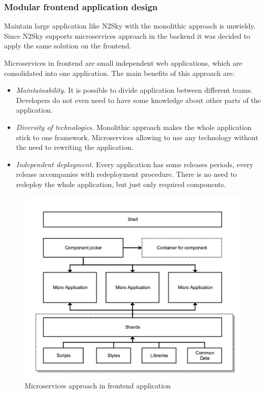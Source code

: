  
 
\subsubsection{Modular frontend application design}\label{Modular frontend application design}

Maintain large application like N2Sky with the monolithic approach is unwieldy. Since N2Sky supports microservices approach in the backend it was decided to apply the same solution on the frontend.  

Microservices in frontend are small independent web applications, which are consolidated into one application. The main benefits of this approach are:

\begin{itemize}
\item \emph{Maintainability.} It is possible to divide application between different teams. Developers do not even need to have some knowledge about other parts of the application. 
\item \emph{Diversity of technologies.} Monolithic approach makes the whole application stick to one framework. Microservices allowing to use any technology without the need to rewriting the application.
\item \emph{Independent deployment.} Every application has some releases periods, every release accompanies with redeployment procedure. There is no need to redeploy the whole application, but just only required components.
\end{itemize}


\begin{figure}[htbp]
\begin{center}
  \includegraphics[width=\linewidth]{components/2/frontend_arch.png}
  \caption{Microservices approach in frontend application}
  \label{fig:frontend_arch}
\end{center}
\end{figure}


